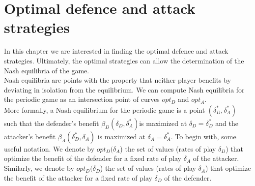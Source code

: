 \chapter{Optimal defence and attack strategies}
\label{chapter:Nash}
%



In this chapter we are interested in finding the optimal defence and attack strategies. Ultimately, the optimal strategies can allow the determination of the Nash equilibria of the game. \\


Nash equilibria are points with the property that neither player benefits by deviating in isolation from the equilibrium. We can compute Nash equilibria for the periodic game as an intersection point of curves $opt_{D}$ and $opt_{A}$. 
\\
More formally, a Nash equilibrium for the periodic game is a point $(\delta_{D}^{*},\delta_{A}^{*})$ such that
the defender's benefit $\beta_{D}(\delta_{D},\delta_{A}^{*}) $is maximized at $\delta_{D}= \delta_{D}^{*}$ and the attacker's benefit
$\beta_{A}(\delta_{D}^{*},\delta_{A}) $ is maximized at $\delta_{A}= \delta_{A}^{*}$.
To begin with, some useful notation. We denote by $opt_{D}(\delta_{A}$) the set of values (rates
of play $\delta_{D}$) that optimize the benefit of the defender for a fixed rate of play $\delta_{A}$ of the
attacker. Similarly, we denote by $opt_{D}(\delta_{D}$) the set of values (rates of play $\delta_{A}$) that optimize
the benefit of the attacker for a fixed rate of play $\delta_{D}$ of the defender. \\



